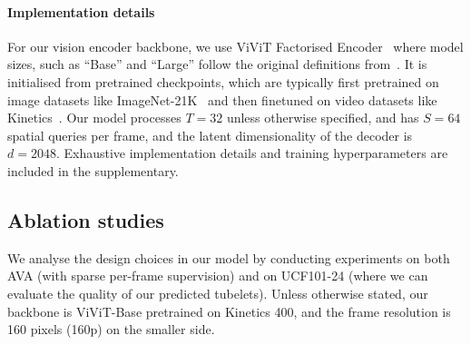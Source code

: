 \documentclass[10pt,twocolumn,letterpaper]{article}
\def \paravspace {-0.7\baselineskip}
\begin{document}
\vspace{\paravspace}
\paragraph{Implementation details}

For our vision encoder backbone, we use ViViT Factorised Encoder~\cite{arnab2021vivit} where model sizes, such as ``Base'' and ``Large'' follow the original definitions from~\cite{devlin_naacl_2019,dosovitskiy_iclr_2021}.
It is initialised from pretrained checkpoints, which are typically first pretrained on image datasets like ImageNet-21K~\cite{deng_cvpr_2009} and then finetuned on video datasets like Kinetics~\cite{kay_arxiv_2017}.
Our model processes $T = 32$ unless otherwise specified, and has $S = 64$ spatial queries per frame, and the latent dimensionality of the decoder is $d=2048$.
Exhaustive implementation details and training hyperparameters are included in the supplementary.






\subsection{Ablation studies}

We analyse the design choices in our model by conducting experiments on both AVA (with sparse per-frame supervision) and on UCF101-24 (where we can evaluate the quality of our predicted tubelets).
Unless otherwise stated, our backbone is ViViT-Base pretrained on Kinetics 400, and the frame resolution is 160 pixels (160p) on the smaller side. 

\vspace{\paravspace}
\end{document}
